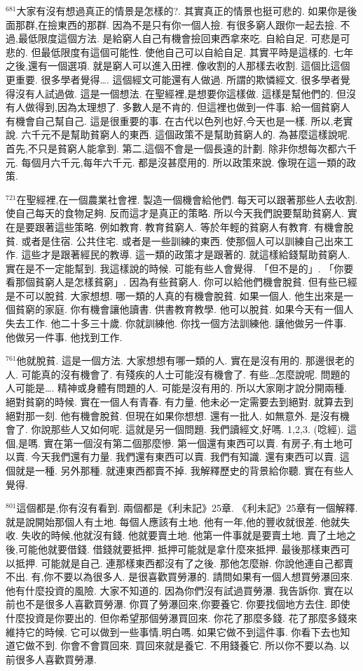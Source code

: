 \documentclass{book}
\begin{document}
$^{681}$大家有沒有想過真正的情景是怎樣的?.
其實真正的情景也挺可悲的.
如果你是後面那群,在撿東西的那群.
因為不是只有你一個人撿.
有很多窮人跟你一起去撿.
不過,最低限度這個方法.
是給窮人自己有機會撿回東西拿來吃.
自給自足.
可悲是可悲的.
但最低限度有這個可能性.
使他自己可以自給自足.
其實平時是這樣的.
七年之後,還有一個選項.
就是窮人可以進入田裡.
像收割的人那樣去收割.
這個比這個更重要.
很多學者覺得….
這個經文可能還有人做過.
所謂的欺憐經文.
很多學者覺得沒有人試過做.
這是一個想法.
在聖經裡,是想要你這樣做.
這樣是幫他們的.
但沒有人做得到,因為太理想了.
多數人是不肯的.
但這裡也做到一件事.
給一個貧窮人有機會自己幫自己.
這是很重要的事.
在古代以色列也好,今天也是一樣.
所以,老實說.
六千元不是幫助貧窮人的東西.
這個政策不是幫助貧窮人的.
為甚麼這樣說呢.
首先,不只是貧窮人能拿到.
第二,這個不會是一個長遠的計劃.
除非你想每次都六千元.
每個月六千元,每年六千元.
都是沒甚麼用的.
所以政策來說.
像現在這一類的政策.

$^{721}$在聖經裡,在一個農業社會裡.
製造一個機會給他們.
每天可以跟著那些人去收割.
使自己每天的食物足夠.
反而這才是真正的策略.
所以今天我們說要幫助貧窮人.
實在是要跟著這些策略.
例如教育.
教育貧窮人.
等於年輕的貧窮人有教育.
有機會脫貧.
或者是住宿.
公共住宅.
或者是一些訓練的東西.
使那個人可以訓練自己出來工作.
這些才是跟著經民的教導.
這一類的政策才是跟著的.
就這樣給錢幫助貧窮人.
實在是不一定能幫到.
我這樣說的時候.
可能有些人會覺得.
「但不是的」.
「你要看那個貧窮人是怎樣貧窮」.
因為有些貧窮人.
你可以給他們機會脫貧.
但有些已經是不可以脫貧.
大家想想.
哪一類的人真的有機會脫貧.
如果一個人.
他生出來是一個貧窮的家庭.
你有機會讓他讀書.
供書教育教學.
他可以脫貧.
如果今天有一個人失去工作.
他二十多三十歲.
你就訓練他.
你找一個方法訓練他.
讓他做另一件事.
他做另一件事.
他找到工作.

$^{761}$他就脫貧.
這是一個方法.
大家想想有哪一類的人.
實在是沒有用的.
那邊很老的人.
可能真的沒有機會了.
有殘疾的人士可能沒有機會了.
有些…怎麼說呢.
問題的人可能是….
精神或身體有問題的人.
可能是沒有用的.
所以大家剛才說分開兩種.
絕對貧窮的時候.
實在一個人有青春.
有力量.
他未必一定需要去到絕對.
就算去到絕對那一刻.
他有機會脫貧.
但現在如果你想想.
還有一批人.
如無意外.
是沒有機會了.
你說那些人又如何呢.
這就是另一個問題.
我們讀經文,好嗎.
1,2,3.
(唸經).
這個,是嗎.
實在第一個沒有第二個那麼慘.
第一個還有東西可以賣.
有房子,有土地可以賣.
今天我們還有力量.
我們還有東西可以賣.
我們有知識.
還有東西可以賣.
這個就是一種.
另外那種.
就連東西都賣不掉.
我解釋歷史的背景給你聽.
實在有些人覺得.

$^{801}$這個都是,你有沒有看到.
兩個都是《利未記》25章.
《利未記》25章有一個解釋.
就是說開始那個人有土地.
每個人應該有土地.
他有一年,他的豐收就很差.
他就失收.
失收的時候,他就沒有錢.
他就要賣土地.
他第一件事就是要賣土地.
賣了土地之後,可能他就要借錢.
借錢就要抵押.
抵押可能就是拿什麼來抵押.
最後那樣東西可以抵押.
可能就是自己.
連那樣東西都沒有了之後.
那他怎麼辦.
你說他連自己都賣不出.
有,你不要以為很多人.
是很喜歡買勞瀑的.
請問如果有一個人想買勞瀑回來.
他有什麼投資的風險.
大家不知道的.
因為你們沒有試過買勞瀑.
我告訴你.
實在以前也不是很多人喜歡買勞瀑.
你買了勞瀑回來,你要養它.
你要找個地方去住.
即使什麼投資是你要出的.
但你希望那個勞瀑買回來.
你花了那麼多錢.
花了那麼多錢來維持它的時候.
它可以做到一些事情,明白嗎.
如果它做不到這件事.
你看下去也知道它做不到.
你會不會買回來.
買回來就是養它.
不用錢養它.
所以你不要以為.
以前很多人喜歡買勞瀑.
\end{document}
